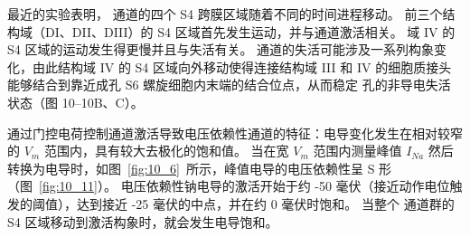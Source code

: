 最近的实验表明， 通道的四个 S4 跨膜区域随着不同的时间进程移动。 
前三个结构域（DI、DII、DIII）的 S4 区域首先发生运动，并与通道激活相关。 
域 IV 的 S4 区域的运动发生得更慢并且与失活有关。 
 通道的失活可能涉及一系列构象变化，由此结构域 IV 的 S4 区域向外移动使得连接结构域 III 和 IV 的细胞质接头能够结合到靠近成孔 S6 螺旋细胞内末端的结合位点，从而稳定 孔的非导电失活状态（图 10–10B、C）。


通过门控电荷控制通道激活导致电压依赖性通道的特征：电导变化发生在相对较窄的 $V_m$ 范围内，具有较大去极化的饱和值。
当在宽 $V_m$ 范围内测量峰值 $I_{Na}$ 然后转换为电导时，如图~\ref{fig:10_6}~所示，峰值电导的电压依赖性呈 S 形（图~\ref{fig:10_11}）。
电压依赖性钠电导的激活开始于约 -50 毫伏（接近动作电位触发的阈值），达到接近 -25 毫伏的中点，并在约 0 毫伏时饱和。 
当整个  通道群的 S4 区域移动到激活构象时，就会发生电导饱和。


